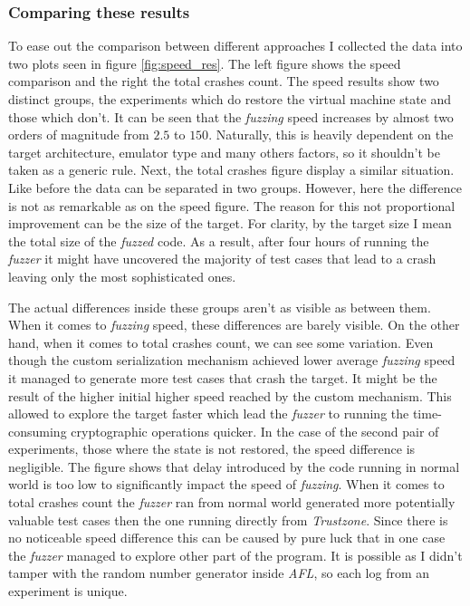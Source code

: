 \pagebreak
\subsubsection{Comparing these results}
To ease out the comparison between different approaches I collected the data into two plots seen in figure \ref{fig:speed_res}. The left figure shows the speed comparison and the right the total crashes count. The speed results show two distinct groups, the experiments which do restore the virtual machine state and those which don't. It can be seen that the \textit{fuzzing} speed increases by almost two orders of magnitude from $2.5$ to $150$. Naturally, this is heavily dependent on the target architecture, emulator type and many others factors, so it shouldn't be taken as a generic rule. Next, the total crashes figure display a similar situation. Like before the data can be separated in two groups. However, here the difference is not as remarkable as on the speed figure. The reason for this not proportional improvement can be the size of the target. For clarity, by the target size I mean the total size of the \textit{fuzzed} code. As a result, after four hours of running the \textit{fuzzer} it might have uncovered the majority of test cases that lead to a crash leaving only the most sophisticated ones.

The actual differences inside these groups aren't as visible as between them. When it comes to \textit{fuzzing} speed, these differences are barely visible. On the other hand, when it comes to total crashes count, we can see some variation. Even though the custom serialization mechanism achieved lower average \textit{fuzzing} speed it managed to generate more test cases that crash the target. It might be the result of the higher initial higher speed reached by the custom mechanism. This allowed to explore the target faster which lead the \textit{fuzzer} to running the time-consuming cryptographic operations quicker. In the case of the second pair of experiments, those where the state is not restored, the speed difference is negligible. The figure shows that delay introduced by the code running in normal world is too low to significantly impact the speed of \textit{fuzzing}. When it comes to total crashes count the \textit{fuzzer} ran from normal world generated more potentially valuable test cases then the one running directly from \textit{Trustzone}. Since there is no noticeable speed difference this can be caused by pure luck that in one case the \textit{fuzzer} managed to explore other part of the program. It is possible as I didn't tamper with the random number generator inside \textit{AFL}, so each log from an experiment is unique.

